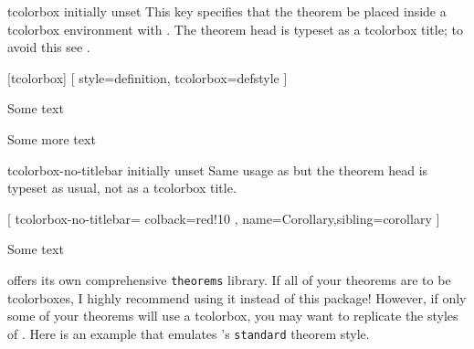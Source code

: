 \documentclass{ltxdoc}
\begin{document}
\begin{docKey}{tcolorbox}
  {}
  {initially unset}
This key specifies that the theorem be placed inside a tcolorbox environment with .
The theorem head is typeset as a tcolorbox title; to avoid this see .

\begin{tcbwritetemp}
[tcolorbox]
[
  style=definition,
  tcolorbox={defstyle}
  ]
\end{tcbwritetemp}

\begin{keythmscode}[withpreamble]
\begin{corollary}
Some text
\end{corollary}
\begin{definition}
Some more text
\end{definition}
\end{keythmscode}

\end{docKey}

\begin{docKey}{tcolorbox-no-titlebar}
  {}
  {initially unset}
Same usage as  but the theorem head is typeset as usual, not as a tcolorbox title.

\begin{tcbwritetemp}
[
  tcolorbox-no-titlebar={
    colback=red!10
    },
  name=Corollary,sibling=corollary
  ]
\end{tcbwritetemp}

\begin{keythmscode}[withpreamble]
\begin{boxcor}
Some text
\end{boxcor}
\end{keythmscode}

\end{docKey}

 offers its own comprehensive \texttt{theorems} library. If all of your theorems are to be tcolorboxes, I highly recommend using it instead of this package! However, if only some of your theorems will use a tcolorbox, you may want to replicate the styles of . Here is an example that emulates 's \texttt{standard} theorem style.
\end{document}
